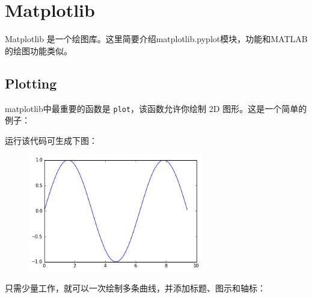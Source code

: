 \section{Matplotlib}
\begin{frame}


Matplotlib 是一个绘图库。这里简要介绍matplotlib.pyplot模块，功能和MATLAB的绘图功能类似。

\end{frame}
\subsection{Plotting}

\begin{frame}

matplotlib中最重要的函数是 \lstinline|plot|，该函数允许你绘制 2D 图形。这是一个简单的例子：

\end{frame}

\begin{frame}

运行该代码可生成下图：
\begin{figure}[htbp]
        \centering
        \includegraphics[width=3in]{images/sine.png}
\end{figure}
\end{frame}

\begin{frame}

只需少量工作，就可以一次绘制多条曲线，并添加标题、图示和轴标：

\end{frame}

